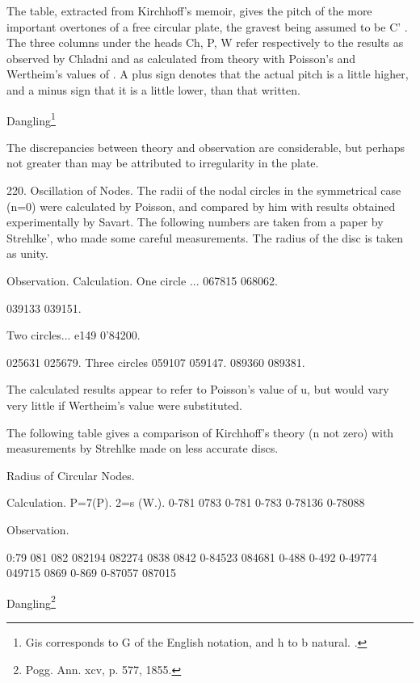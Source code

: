 The table, extracted from Kirchhoff's memoir, gives the pitch of the
more important overtones of a free circular plate, the gravest being
assumed to be C' . The three columns under the heads Ch, P, W refer
respectively to the results as observed by Chladni and as calculated
from theory with Poisson's and Wertheim's values of . A plus sign
denotes that the actual pitch is a little higher, and a minus sign that
it is a little lower, than that written.

Dangling\footnote{ Gis corresponds to G of the English notation, and h to b natural. .}

The discrepancies between theory and observation are considerable, but
perhaps not greater than may be attributed to irregularity in the plate.

220.  Oscillation of Nodes.
The radii of the nodal circles in the symmetrical case (n=0) were
calculated by Poisson, and compared by him with results obtained
experimentally by Savart. The following numbers are taken from a paper
by Strehlke', who made some careful measurements. The radius of the disc
is taken as unity.

Observation. Calculation. One circle ... 067815 068062.

039133 039151.

Two circles... e149 0'84200.

025631 025679. Three circles 059107 059147. 089360 089381.

The calculated results appear to refer to Poisson's value of u, but
would vary very little if Wertheim's value were substituted.

The following table gives a comparison of Kirchhoff's theory (n not zero)
with measurements by Strehlke made on less accurate discs.

Radius of Circular Nodes.

Calculation. P=7(P). 2=s (W.). 0-781 0783 0-781 0-783 0-78136 0-78088

Observation.

0:79 081 082 082194 082274 0838 0842 0-84523 084681 0-488 0-492 0-49774
049715 0869 0-869 0-87057 087015

Dangling\footnote{ Pogg. Ann. xcv, p. 577, 1855.}

